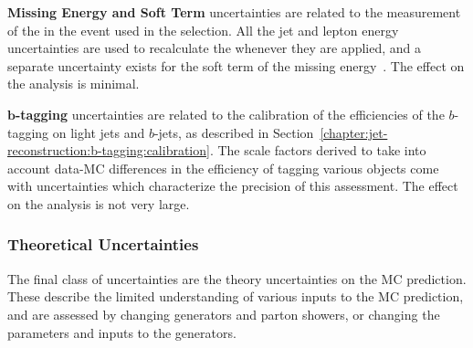 	\textbf{Missing Energy and Soft Term} uncertainties are related to the measurement of the \met in the event used in the selection. All the jet and lepton energy uncertainties are used to recalculate the \met whenever they are applied, and a separate uncertainty exists for the soft term of the missing energy~\cite{Aad:2012re,ATLAS-CONF-2013-082}. The effect on the analysis is minimal.

	\textbf{$\mathbf{b}$-tagging} uncertainties are related to the calibration of the efficiencies of the $b$-tagging on light jets and $b$-jets, as described in Section~\ref{chapter:jet-reconstruction:b-tagging:calibration}. The scale factors derived to take into account data-MC differences in the efficiency of tagging various objects come with uncertainties which characterize the precision of this assessment. The effect on the analysis is not very large.


	\subsubsection{Theoretical Uncertainties}
	\label{chapter:color:uncertainties:theory}

	The final class of uncertainties are the theory uncertainties on the MC prediction. These describe the limited understanding of various inputs to the MC prediction, and are assessed by changing generators and parton showers, or changing the parameters and inputs to the generators.


